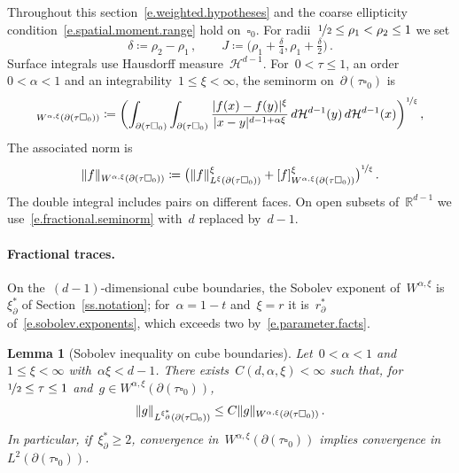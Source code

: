 \documentclass[11pt,letterpaper]{article}
\numberwithin{equation}{section}
\newtheorem{lemma}[theorem]{Lemma}
\theoremstyle{definition}
\newcommand{\R}{\mathbb{R}}
\newcommand{\nf}{\nicefrac}
\newcommand{\cu}{\square}
\DeclarePairedDelimiter{\norm}{\lVert}{\rVert}
\begin{document}
\smallskip

Throughout this section~\eqref{e.weighted.hypotheses} and the coarse ellipticity condition~\eqref{e.spatial.moment.range} hold on~$\cu_0$. For radii~$\nf12\leq\rho_1<\rho_2\leq1$ we set
\begin{equation}
	\delta\coloneqq\rho_2-\rho_1\,,\qquad J\coloneqq\bigl(\rho_1+\tfrac\delta4,\rho_1+\tfrac\delta2\bigr)\,.
	\label{e.selection.parameters}
\end{equation}
Surface integrals use Hausdorff measure~$\mathcal H^{d-1}$. For~$0<\tau\leq1$, an order~$0<\alpha<1$ and an integrability~$1\leq\xi<\infty$, the seminorm on~$\partial(\tau\cu_0)$ is
\begin{equation}
	[f]_{W^{\alpha,\xi}(\partial(\tau\cu_0))}\coloneqq\biggl(\int_{\partial(\tau\cu_0)}\int_{\partial(\tau\cu_0)}\frac{|f(x)-f(y)|^\xi}{|x-y|^{d-1+\alpha\xi}}\,d\mathcal H^{d-1}(y)\,d\mathcal H^{d-1}(x)\biggr)^{\nf1\xi}\,,
	\label{e.boundary.fractional.seminorm}
\end{equation}
The associated norm is
\begin{equation*}
	\norm{f}_{W^{\alpha,\xi}(\partial(\tau\cu_0))}\coloneqq\bigl(\norm{f}_{L^\xi(\partial(\tau\cu_0))}^\xi+[f]_{W^{\alpha,\xi}(\partial(\tau\cu_0))}^\xi\bigr)^{\nf1\xi}\,.
\end{equation*}
The double integral includes pairs on different faces. On open subsets of~$\R^{d-1}$ we use~\eqref{e.fractional.seminorm} with~$d$ replaced by~$d-1$.

\paragraph{Fractional traces.} On the~$(d-1)$-dimensional cube boundaries, the Sobolev exponent of~$W^{\alpha,\xi}$ is~$\xi_\partial^*$ of Section~\ref{ss.notation}; for~$\alpha=1-t$ and~$\xi=r$ it is~$r_\partial^*$ of~\eqref{e.sobolev.exponents}, which exceeds two by~\eqref{e.parameter.facts}.

\begin{lemma}[Sobolev inequality on cube boundaries]
\label{l.critical.trace.embedding}
Let~$0<\alpha<1$ and~$1\leq\xi<\infty$ with~$\alpha\xi<d-1$. There exists~$C(d,\alpha,\xi)<\infty$ such that, for~$\nf12\leq\tau\leq1$ and~$g\in W^{\alpha,\xi}(\partial(\tau\cu_0))$,
\begin{equation}
	\norm{g}_{L^{\xi_\partial^*}(\partial(\tau\cu_0))}\leq C\norm{g}_{W^{\alpha,\xi}(\partial(\tau\cu_0))}\,.
	\label{e.critical.trace.embedding}
\end{equation}
In particular, if~$\xi_\partial^*\geq2$, convergence in~$W^{\alpha,\xi}(\partial(\tau\cu_0))$ implies convergence in~$L^2(\partial(\tau\cu_0))$.
\end{lemma}
\end{document}
